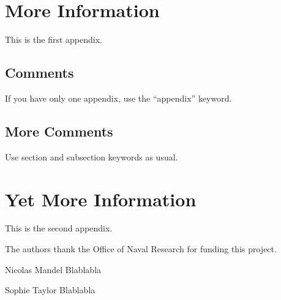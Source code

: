\documentclass[twocolumn,letterpaper]{IEEEAerospaceCLS}  %
\begin{document}
\section{More Information}        %
This is the first appendix. 

\subsection{Comments}
If you have only one appendix, use the ``appendix'' keyword.

\subsection{More Comments}
Use section and subsection keywords as usual.

\section{Yet More Information}    %
This is the second appendix.



\acknowledgments
The authors thank the Office of Naval Research for funding this project.







\thebiography
\begin{biographywithpic}
{Nicolas Mandel}{}
Blablabla
\end{biographywithpic} 

\begin{biographywithpic}
{Sophie Taylor}{}
Blablabla
\end{biographywithpic}
\end{document}
